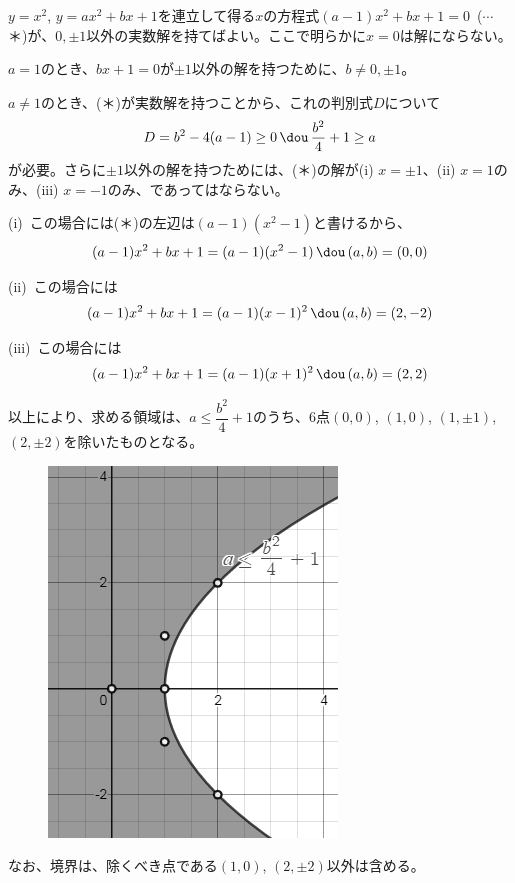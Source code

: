 $y=x^2$, $y=ax^2+bx+1$を連立して得る$x$の方程式$(a-1)x^2+bx+1=0$~($\cdots$ ＊)が、$0, \pm1$以外の実数解を持てばよい。ここで明らかに$x=0$は解にならない。

$a=1$のとき、$bx+1=0$が$\pm1$以外の解を持つために、$b\neq0, \pm1$。

$a\neq 1$のとき、(＊)が実数解を持つことから、これの判別式$D$について
\[ D=b^2-4(a-1)\ge 0 \,\dou\, \frac{b^2}{4}+1\ge a \]
が必要。さらに$\pm 1$以外の解を持つためには、(＊)の解が(i) $x=\pm 1$、(ii) $x=1$のみ、(iii) $x=-1$のみ、であってはならない。

(i)~この場合には(＊)の左辺は$(a-1)(x^2-1)$と書けるから、
\[ (a-1)x^2+bx+1=(a-1)(x^2-1) \,\dou\, (a, b)=(0, 0) \]

(ii)~この場合には
\[ (a-1)x^2+bx+1=(a-1)(x-1)^2 \,\dou\, (a, b)=(2,-2) \]

(iii)~この場合には
\[ (a-1)x^2+bx+1=(a-1)(x+1)^2 \,\dou\, (a, b)=(2, 2) \]

以上により、求める領域は、$a\le\dfrac{b^2}{4}+1$のうち、6点$(0, 0)$, $(1, 0)$, $(1, \pm1)$, $(2, \pm2)$を除いたものとなる。
\begin{figure}[H]
 \centering
 \includegraphics[width=0.6\linewidth]{../problems/Q_192/A_192_2.png}
\end{figure}
なお、境界は、除くべき点である$(1,0)$, $(2,\pm2)$以外は含める。